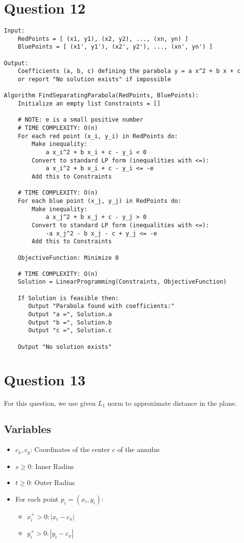 \documentclass{article}
\begin{document}
\section*{Question 12}
\begin{verbatim}
Input: 
    RedPoints = [ (x1, y1), (x2, y2), ..., (xn, yn) ]
    BluePoints = [ (x1', y1'), (x2', y2'), ..., (xn', yn') ]

Output:
    Coefficients (a, b, c) defining the parabola y = a x^2 + b x + c
    or report "No solution exists" if impossible

Algorithm FindSeparatingParabola(RedPoints, BluePoints): 
    Initialize an empty list Constraints = []

    # NOTE: e is a small positive number
    # TIME COMPLEXITY: O(n)
    For each red point (x_i, y_i) in RedPoints do:
        Make inequality:
            a x_i^2 + b x_i + c - y_i < 0
        Convert to standard LP form (inequalities with <=):
            a x_i^2 + b x_i + c - y_i <= -e
        Add this to Constraints

    # TIME COMPLEXITY: O(n)
    For each blue point (x_j, y_j) in RedPoints do:
        Make inequality:
            a x_j^2 + b x_j + c - y_j > 0
        Convert to standard LP form (inequalities with <=):
            -a x_j^2 - b x_j - c + y_j <= -e
        Add this to Constraints

    ObjectiveFunction: Minimize 0

    # TIME COMPLEXITY: O(n)
    Solution = LinearProgramming(Constraints, ObjectiveFunction)

    If Solution is feasible then:
       Output "Parabola found with coefficients:"
       Output "a =", Solution.a
       Output "b =", Solution.b
       Output "c =", Solution.c

    Output "No solution exists"

\end{verbatim}

\newpage

\section*{Question 13}
For this question, we use given $L_1$ norm to approximate distance in the plane.

\subsection*{Variables}
\begin{itemize}
    \item \( c_x, c_y \): Coordinates of the center $c$ of the annulus
    \item \( s \geq 0 \): Inner Radius 
    \item \( t \geq 0 \): Outer Radius
    \item For each point \( p_i = (x_i, y_i) \):
    \begin{itemize}
        \item $x_i^{+} > 0: |x_i - c_x|$ 
        \item $y_i^{+} > 0: |y_i - c_x|$
    \end{itemize}
\end{itemize}
\end{document}
